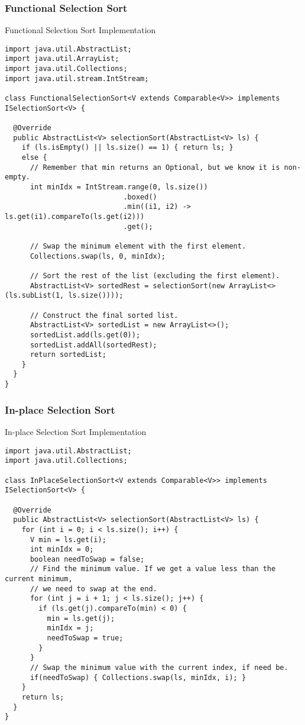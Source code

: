 \subsubsection*{Functional Selection Sort}
\begin{cl}{Functional Selection Sort Implementation}
\begin{lstlisting}[language=MyJava]
import java.util.AbstractList;
import java.util.ArrayList;
import java.util.Collections;
import java.util.stream.IntStream;

class FunctionalSelectionSort<V extends Comparable<V>> implements ISelectionSort<V> {

  @Override
  public AbstractList<V> selectionSort(AbstractList<V> ls) {
    if (ls.isEmpty() || ls.size() == 1) { return ls; }
    else {
      // Remember that min returns an Optional, but we know it is non-empty.
      int minIdx = IntStream.range(0, ls.size())
                            .boxed()
                            .min((i1, i2) -> ls.get(i1).compareTo(ls.get(i2)))
                            .get();

      // Swap the minimum element with the first element.
      Collections.swap(ls, 0, minIdx);

      // Sort the rest of the list (excluding the first element).
      AbstractList<V> sortedRest = selectionSort(new ArrayList<>(ls.subList(1, ls.size())));

      // Construct the final sorted list.
      AbstractList<V> sortedList = new ArrayList<>();
      sortedList.add(ls.get(0));
      sortedList.addAll(sortedRest);
      return sortedList;
    }
  }
}
\end{lstlisting}
\end{cl}

\subsubsection*{In-place Selection Sort}
\begin{cl}{In-place Selection Sort Implementation}
\begin{lstlisting}[language=MyJava]
import java.util.AbstractList;
import java.util.Collections;

class InPlaceSelectionSort<V extends Comparable<V>> implements ISelectionSort<V> {
  
  @Override
  public AbstractList<V> selectionSort(AbstractList<V> ls) {
    for (int i = 0; i < ls.size(); i++) {
      V min = ls.get(i);
      int minIdx = 0;
      boolean needToSwap = false;
      // Find the minimum value. If we get a value less than the current minimum,
      // we need to swap at the end.
      for (int j = i + 1; j < ls.size(); j++) {
        if (ls.get(j).compareTo(min) < 0) {
          min = ls.get(j);
          minIdx = j;
          needToSwap = true;
        }
      }
      // Swap the minimum value with the current index, if need be.
      if(needToSwap) { Collections.swap(ls, minIdx, i); }
    }
    return ls;
  }
}
\end{lstlisting}  
\end{cl}

